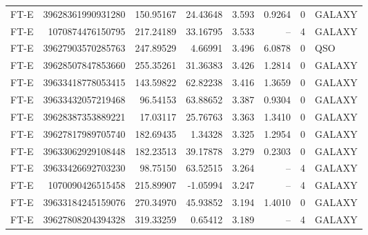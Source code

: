\begin{ruledtabular}
\begin{tabular}{l r r r r r r l}
FT-E & 39628361990931280 & 150.95167 & 24.43648 & 3.593 & 0.9264 & 0 & GALAXY \\
FT-E & 1070874476150795 & 217.24189 & 33.16795 & 3.533 & -- & 4 & GALAXY \\
FT-E & 39627903570285763 & 247.89529 & 4.66991 & 3.496 & 6.0878 & 0 & QSO \\
FT-E & 39628507847853660 & 255.35261 & 31.36383 & 3.426 & 1.2814 & 0 & GALAXY \\
FT-E & 39633418778053415 & 143.59822 & 62.82238 & 3.416 & 1.3659 & 0 & GALAXY \\
FT-E & 39633432057219468 & 96.54153 & 63.88652 & 3.387 & 0.9304 & 0 & GALAXY \\
FT-E & 39628387353889221 & 17.03117 & 25.76763 & 3.363 & 1.3410 & 0 & GALAXY \\
FT-E & 39627817989705740 & 182.69435 & 1.34328 & 3.325 & 1.2954 & 0 & GALAXY \\
FT-E & 39633062929108448 & 182.23513 & 39.17878 & 3.279 & 0.2303 & 0 & GALAXY \\
FT-E & 39633426692703230 & 98.75150 & 63.52515 & 3.264 & -- & 4 & GALAXY \\
FT-E & 1070090426515458 & 215.89907 & -1.05994 & 3.247 & -- & 4 & GALAXY \\
FT-E & 39633184245159076 & 270.34970 & 45.93852 & 3.194 & 1.4010 & 0 & GALAXY \\
FT-E & 39627808204394328 & 319.33259 & 0.65412 & 3.189 & -- & 4 & GALAXY \\
\end{tabular}
\end{ruledtabular}
